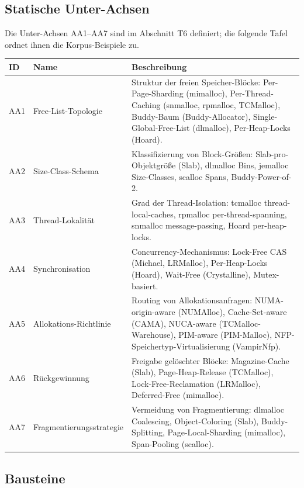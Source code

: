 \subsection*{Statische Unter-Achsen}

Die Unter-Achsen AA1--AA7 sind im Abschnitt T6 definiert; die folgende Tafel ordnet ihnen die Korpus-Beispiele zu.

\begin{scriptsize}
\begin{longtable}{@{}>{\raggedright\arraybackslash}p{1.8cm} >{\raggedright\arraybackslash}p{3.2cm} >{\raggedright\arraybackslash}p{8.5cm}@{}}
\toprule
ID & Name & Beschreibung \\
\midrule
\endhead%
AA1 & Free-List-Topologie & Struktur der freien Speicher-Blöcke: Per-Page-Sharding (mimalloc), Per-Thread-Caching (snmalloc, rpmalloc, TCMalloc), Buddy-Baum (Buddy-Allocator), Single-Global-Free-List (dlmalloc), Per-Heap-Locks (Hoard). \\
AA2 & Size-Class-Schema & Klassifizierung von Block-Größen: Slab-pro-Objektgröße (Slab), dlmalloc Bins, jemalloc Size-Classes, scalloc Spans, Buddy-Power-of-2. \\
AA3 & Thread-Lokalität & Grad der Thread-Isolation: tcmalloc thread-local-caches, rpmalloc per-thread-spanning, snmalloc message-passing, Hoard per-heap-locks. \\
AA4 & Synchronisation & Concurrency-Mechanismus: Lock-Free CAS (Michael, LRMalloc), Per-Heap-Locks (Hoard), Wait-Free (Crystalline), Mutex-basiert. \\
AA5 & Allokations-Richtlinie & Routing von Allokationsanfragen: NUMA-origin-aware (NUMAlloc), Cache-Set-aware (CAMA), NUCA-aware (TCMalloc-Warehouse), PIM-aware (PIM-Malloc), NFP-Speichertyp-Virtualisierung (Vampir\allowbreak{}Nfp). \\
AA6 & Rückgewinnung & Freigabe gelöschter Blöcke: Magazine-Cache (Slab), Page-Heap-Release (TCMalloc), Lock-Free-Reclamation (LRMalloc), Deferred-Free (mimalloc). \\
AA7 & Fragmentierungsstrategie & Vermeidung von Fragmentierung: dlmalloc Coalescing, Object-Coloring (Slab), Buddy-Splitting, Page-Local-Sharding (mimalloc), Span-Pooling (scalloc). \\
\bottomrule
\end{longtable}
\end{scriptsize}

\subsection*{Bausteine}

